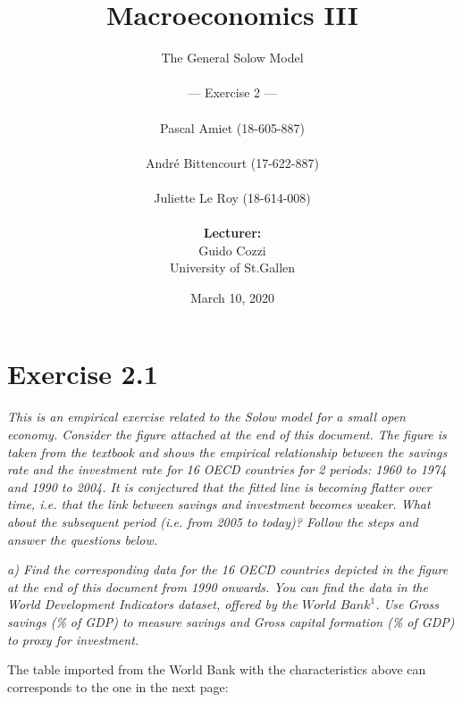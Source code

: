 \documentclass[11pt]{article} %
\begin{document}
\title{\huge{Macroeconomics III}}

\author{The General Solow Model\\
    \\
    --- Exercise 2 ---\\
    \\
    Pascal Amiet (18-605-887)\\
    \\
    André Bittencourt (17-622-887)\\
    \\
    Juliette Le Roy (18-614-008)\\
    \\
    \textbf{Lecturer:}\\Guido Cozzi\\
    University of St.Gallen}
\date{March 10, 2020}
\maketitle
\thispagestyle{empty}

\pagebreak
\section{Exercise 2.1}
\bigskip
\textit{This is an empirical exercise related to the Solow model for a small open economy. Consider
the figure attached at the end of this document. The figure is taken from the textbook and
shows the empirical relationship between the savings rate and the investment rate for 16
OECD countries for 2 periods: 1960 to 1974 and 1990 to 2004. It is conjectured that the
fitted line is becoming flatter over time, i.e. that the link between savings and investment
becomes weaker. What about the subsequent period (i.e. from 2005 to today)? Follow
the steps and answer the questions below.}

\par

\noindent\textit{a) Find the corresponding data for the 16 OECD countries depicted in the figure at the end of this document from 1990 onwards. You can find the data in the World Development
Indicators dataset, offered by the $World$ $Bank^1$. Use Gross savings (\% of GDP) to
measure savings and Gross capital formation (\% of GDP) to proxy for investment.}\par

The table imported from the World Bank with the characteristics above can corresponds to the one in the next page:\par
\end{document}
